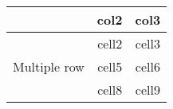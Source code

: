 \documentclass[paper.tex]{subfiles}
\begin{document}
	
\begin{center}
	\begin{tabular}{ |c|c|c| } 
		\hline
		 & col2 & col3 \\
		\hline
		\multirow{3}{4em}{Multiple row} 
		& cell2 & cell3 \\ 
		& cell5 & cell6 \\ 
		& cell8 & cell9 \\ 
		\hline
	\end{tabular}
\end{center}
\end{document}
